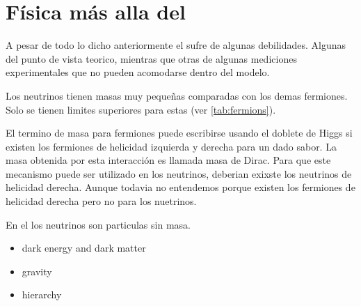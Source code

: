 \section{Física más alla del {\SM}}

A pesar de todo lo dicho anteriormente el {\SM} sufre de algunas debilidades. Algunas del
punto de vista teorico, mientras que otras de algunas mediciones experimentales que no pueden
acomodarse dentro del modelo.


Los neutrinos tienen masas muy peque\~nas comparadas con los demas fermiones. Solo se tienen
limites superiores para estas (ver {\tab} \ref{tab:fermions}).

El termino de masa para fermiones puede escribirse usando el doblete de Higgs si existen
los fermiones de helicidad izquierda y derecha para un dado sabor. La masa obtenida por
esta interacci\'on es llamada masa de Dirac. Para que este mecanismo puede ser utilizado
en los neutrinos, deberian exixste los neutrinos de helicidad derecha. Aunque todavia
no entendemos porque existen los fermiones de helicidad derecha pero no para los nuetrinos.

En el {\SM} los neutrinos son particulas sin masa.

\begin{itemize}\itemsep0.2cm\parskip0.2cm
\item  dark energy and dark matter

\item gravity

\item hierarchy
\end{itemize}
